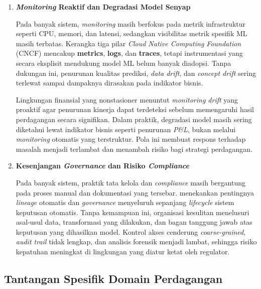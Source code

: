 \begin{enumerate}
    \vspace{0.5em}

    \item \textbf{\textit{Monitoring} Reaktif dan Degradasi Model Senyap}
    
    Pada banyak sistem, \textit{monitoring} masih berfokus pada metrik infrastruktur seperti CPU, memori, dan latensi, sedangkan visibilitas metrik spesifik ML masih terbatas. Kerangka tiga pilar \textit{Cloud Native Computing Foundation} (CNCF) mencakup \textbf{metrics}, \textbf{logs}, dan \textbf{traces}, tetapi instrumentasi yang secara eksplisit mendukung model ML belum banyak diadopsi. Tanpa dukungan ini, penurunan kualitas prediksi, \textit{data drift}, dan \textit{concept drift} sering terlewat sampai dampaknya dirasakan pada indikator bisnis.
    
    Lingkungan finansial yang nonstasioner menuntut \textit{monitoring drift} yang proaktif agar penurunan kinerja dapat terdeteksi sebelum memengaruhi hasil perdagangan secara signifikan. Dalam praktik, degradasi model masih sering diketahui lewat indikator bisnis seperti penurunan \textit{P\&L}, bukan melalui \textit{monitoring} otomatis yang terstruktur. Pola ini membuat respons terhadap masalah menjadi terlambat dan menambah risiko bagi strategi perdagangan.

    \vspace{0.5em}

    \item \textbf{Kesenjangan \textit{Governance} dan Risiko \textit{Compliance}}
    
    Pada banyak sistem, praktik tata kelola dan \textit{compliance} masih bergantung pada proses manual dan dokumentasi yang tersebar. \textcite{stoyanovich2020responsible} menekankan pentingnya \textit{lineage} otomatis dan \textit{governance} menyeluruh sepanjang \textit{lifecycle} sistem keputusan otomatis. Tanpa kemampuan ini, organisasi kesulitan menelusuri asal-usul data, transformasi yang dilakukan, dan bagan tanggung jawab atas keputusan yang dihasilkan model. Kontrol akses cenderung \textit{coarse-grained}, \textit{audit trail} tidak lengkap, dan analisis forensik menjadi lambat, sehingga risiko kepatuhan meningkat di lingkungan yang diatur ketat oleh regulator.
\end{enumerate}

\subsection{Tantangan Spesifik Domain Perdagangan}

